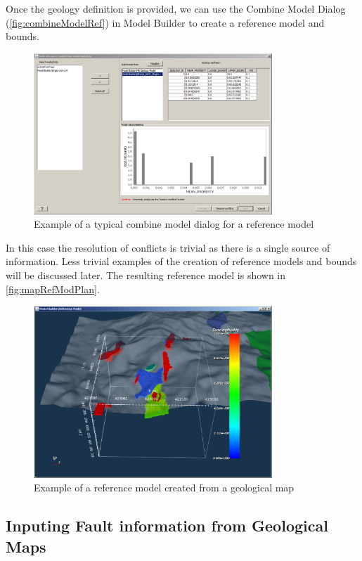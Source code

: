 Once the geology definition is provided, we can use the Combine Model Dialog (\autoref{fig:combineModelRef}) in Model Builder to create a reference model and bounds. 
\begin{figure} [h]
    \centering
    \includegraphics[width=0.8\textwidth]{images/MaptoModel/combineModelRef.PNG}
    \caption{Example of a typical combine model dialog for a reference model}
    \label{fig:combineModelRef}
\end{figure}
In this case the resolution of conflicts is trivial as there is a single source of information. Less trivial examples of the creation of reference models and bounds will be discussed later. The resulting reference model is shown in \autoref{fig:mapRefModPlan}.
\begin{figure} [h]
    \centering
    \includegraphics[width=0.8\textwidth]{images/MaptoModel/mapRefModPlan.PNG}
    \caption{Example of a reference model created from a geological map}
    \label{fig:mapRefModPlan}
\end{figure}

\subsection{Inputing Fault information from Geological Maps}
\label{subsec:Inputing Fault information from Geological Maps}

